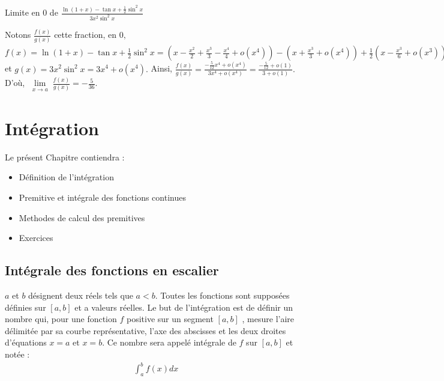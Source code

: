 \documentclass[letterpaper,10pt,french]{jupyterBook}
\begin{document}
\sphinxAtStartPar
Limite en \(0\) de \(\frac{\ln(1+x)-\tan x+\frac{1}{2}\sin^2 x}{3 x^2 \sin^2 x}\)

\sphinxAtStartPar
Notons \(\frac{f(x)}{g(x)}\) cette fraction, en \(0,\) \(f(x)=\ln(1+x)-\tan x+\frac{1}{2}\sin^2 x=(x-\frac{x^2}{2}+\frac{x^3}{3}-\frac{x^4}{4}+o(x^4))-(x+\frac{x^3}{3}+o(x^4))+\frac{1}{2}(x-\frac{x^3}{6}+o(x^3))^2=-\frac{5}{12}x^4+o(x^4)\) et \(g(x)=3x^2 \sin^2 x=3x^4+o(x^4).\) Ainsi, \(\frac{f(x)}{g(x)}=\frac{-\frac{5}{12}x^4+o(x^4)}{3x^4+o(x^4)}=\frac{-\frac{5}{12}+o(1)}{3+o(1)}.\) D’où, \(\lim\limits_{\substack{x \rightarrow a}}\frac{f(x)}{g(x)}=-\frac{5}{36}.\)


\chapter{Intégration}
\label{\detokenize{integrationd:integration}}\label{\detokenize{integrationd::doc}}
\sphinxAtStartPar
Le présent Chapitre contiendra :
\begin{itemize}
\item {} 
\sphinxAtStartPar
Définition de l’intégration

\item {} 
\sphinxAtStartPar
Premitive et intégrale des fonctions continues

\item {} 
\sphinxAtStartPar
Methodes de calcul des premitives

\item {} 
\sphinxAtStartPar
Exercices

\end{itemize}


\section{Intégrale des fonctions en escalier}
\label{\detokenize{fe:integrale-des-fonctions-en-escalier}}\label{\detokenize{fe::doc}}
\sphinxAtStartPar
\(a\) et \(b\) désignent deux réels tels que \(a < b \). Toutes    les fonctions sont supposées définies sur \([a, b]\) et a valeurs réelles.
Le but de l’intégration est de définir un nombre qui, pour une fonction \(f\) positive sur un segment \([a, b]\) , mesure l’aire délimitée par sa courbe représentative, l’axe des abscisses et les deux droites d’équations \(x = a\) et \(x = b\).
Ce nombre sera appelé intégrale de \(f\) sur \([a, b]\) et notée :
\begin{equation*}
\begin{split}
\int_a^b f(x)dx
\end{split}
\end{equation*}
\end{document}
